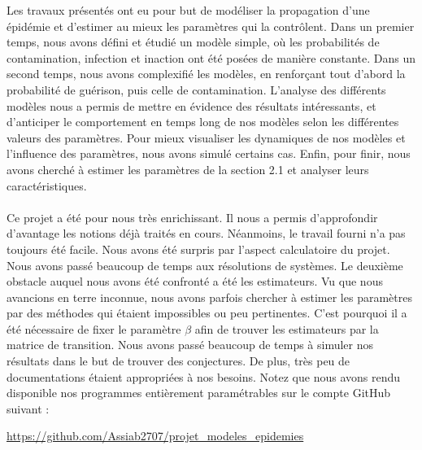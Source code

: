 \documentclass[12pt,a4paper]{report}
\theoremstyle{remark}
\begin{document}
Les travaux présentés ont eu pour but de modéliser la propagation d'une épidémie et d’estimer au mieux les paramètres qui la contrôlent. Dans un premier temps, nous avons défini et étudié un modèle simple, où les probabilités de contamination, infection et inaction ont été posées de manière constante. Dans un second temps, nous avons complexifié les modèles, en renforçant tout d’abord la probabilité de guérison, puis celle de  contamination. L’analyse des différents modèles nous a permis de mettre en évidence des résultats intéressants, et d’anticiper le comportement en temps long de nos modèles selon les différentes valeurs des paramètres. Pour mieux visualiser les dynamiques de nos modèles et l’influence des paramètres, nous avons simulé certains cas. Enfin, pour finir,  nous avons cherché à estimer les paramètres de la section 2.1 et analyser leurs caractéristiques.
\\
\\
Ce projet a été pour nous très enrichissant. Il nous a permis d’approfondir d’avantage les notions déjà traités en cours. Néanmoins, le travail fourni n’a pas toujours été facile. Nous avons été surpris par l'aspect calculatoire du projet. Nous avons passé beaucoup de temps aux résolutions de systèmes. Le deuxième obstacle auquel nous avons été confronté a été les estimateurs. Vu que nous avancions en terre inconnue, nous avons parfois chercher à estimer les paramètres par des méthodes qui étaient impossibles ou peu pertinentes. C’est pourquoi il a été nécessaire de fixer le paramètre $\beta$ afin de trouver les estimateurs par la matrice de transition. Nous avons passé beaucoup de temps à simuler nos résultats dans le but de trouver des conjectures. De plus, très peu de documentations étaient appropriées à nos besoins. Notez que nous avons rendu disponible nos programmes entièrement paramétrables sur le compte GitHub suivant :  
\begin{center}
    \url{https://github.com/Assiab2707/projet_modeles_epidemies}
\end{center}
\end{document}
